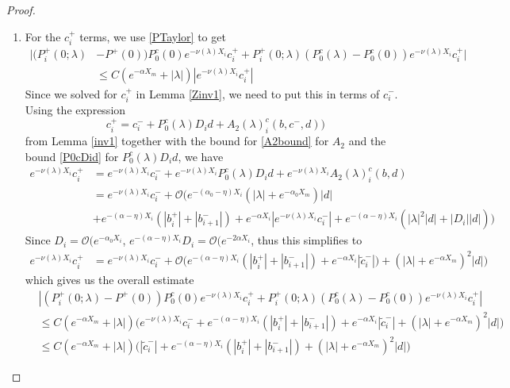 \documentclass[thesis.tex]{subfiles}
\begin{document}
\begin{lemma}
\begin{proof}
\begin{enumerate}
\item For the $c_i^+$ terms, we use \eqref{PTaylor} to get
\begin{align*}
|(P_i^+(0; \lambda) &- P^+(0))P_0^c(0) e^{-\nu(\lambda)X_i} c_i^+ + P_i^+(0; \lambda) (P_0^c(\lambda) - P_0^c(0)) e^{-\nu(\lambda)X_i} c_i^+| \\
&\leq C (e^{-\alpha X_m} + |\lambda|)|e^{-\nu(\lambda)X_i} c_i^+|
\end{align*}
Since we solved for $c_i^+$ in Lemma \ref{Zinv1}, we need to put this in terms of $c_i^-$. Using the expression
\[
c_i^+ = c_i^- + P_0^c(\lambda) D_i d + A_2(\lambda)_i^c(b, c^-, d) )
\]
from Lemma \ref{inv1} together with the bound for \eqref{A2bound} for $A_2$ and the bound \eqref{P0cDid} for $P_0^c(\lambda) D_i d$, we have
\begin{align*}
e^{-\nu(\lambda)X_i} c_i^+ &= e^{-\nu(\lambda)X_i} c_i^- 
+ e^{-\nu(\lambda)X_i} P_0^c(\lambda) D_i d + e^{-\nu(\lambda)X_i} A_2(\lambda)_i^c(b, d)\\
&= e^{-\nu(\lambda)X_i} c_i^- + \mathcal{O}\Big( e^{-(\alpha_0 - \eta) X_i} ( |\lambda| + e^{-\alpha_0 X_m} ) |d| \\
&+ e^{-(\alpha - \eta) X_i} (|b_i^+| + |b_{i+1}^-|) + e^{-\alpha X_i} |e^{-\nu(\lambda)X_i} c_i^-| + e^{-(\alpha - \eta) X_i}(|\lambda|^2|d| + |D_i||d| ) \Big)
\end{align*}
Since $D_i = \mathcal{O}(e^{-\alpha_0 X_i}$, $e^{-(\alpha - \eta) X_i} D_i = \mathcal{O}(e^{-2 \alpha X_i}$, thus this simplifies to
\begin{align}\label{tildecminus2}
e^{-\nu(\lambda)X_i} c_i^+
&= e^{-\nu(\lambda)X_i} c_i^- + \mathcal{O}\Big( 
e^{-(\alpha - \eta) X_i} (|b_i^+| + |b_{i+1}^-|) + e^{-\alpha X_i} |\tilde{c}_i^-|) 
+ ( |\lambda| + e^{-\alpha X_m} )^2 |d| \Big)
\end{align}
which gives us the overall estimate
\begin{align*}
&|(P_i^+(0; \lambda) - P^+(0))P_0^c(0) e^{-\nu(\lambda)X_i} c_i^+ + P_i^+(0; \lambda) (P_0^c(\lambda) - P_0^c(0)) e^{-\nu(\lambda)X_i} c_i^+| \\
&\leq C (e^{-\alpha X_m} + |\lambda|) \Big( e^{-\nu(\lambda)X_i} c_i^-+ e^{-(\alpha - \eta) X_i} (|b_i^+| + |b_{i+1}^-|) + e^{-\alpha X_i} |\tilde{c}_i^-| 
+ ( |\lambda| + e^{-\alpha X_m} )^2 |d| \Big) \\
&\leq C (e^{-\alpha X_m} + |\lambda|) \Big( |\tilde{c}_i^-|  
+ e^{-(\alpha - \eta) X_i} (|b_i^+| + |b_{i+1}^-|) 
+ ( |\lambda| + e^{-\alpha X_m} )^2 |d| \Big)
\end{align*}


\end{enumerate}
\end{proof}
\end{lemma}
\end{document}
